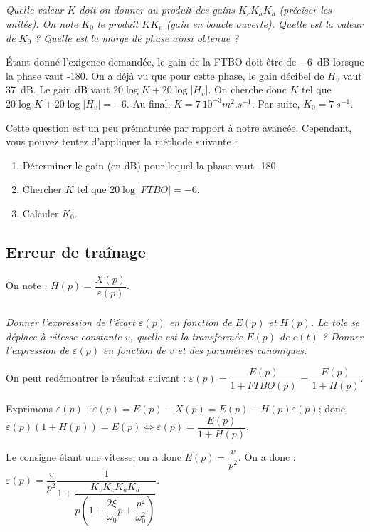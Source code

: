 \documentclass[10pt,fleqn]{article} %
\begin{document}
\begin{multicols}{2}
\subparagraph{}\textit{Quelle valeur $K$ doit-on donner au produit des gains $K_c K_a K_d$ (préciser les unités).
On note $K_0$ le produit $KK_v$ (gain en boucle ouverte). Quelle est la valeur de $K_0$ ?
Quelle est la marge de phase ainsi obtenue ?}
\ifprof
\begin{corrige}
Étant donné l'exigence demandée, le gain de la FTBO doit être de \SI{-6}{dB} lorsque la phase vaut -180\degres.
On a déjà vu que pour cette phase, le gain décibel de $H_v$ vaut \SI{37}{dB}. Le gain dB vaut $20\log K + 20 \log |H_v|$. On cherche donc $K$ tel que $20\log K + 20 \log |H_v|=-6$. Au final, $K=\SI{7}{10^{-3}m^2.s^{-1}}$. Par suite, $K_0=\SI{7}{s^{-1}}$.
\end{corrige}
\else
\fi

\begin{methode}
Cette question est un peu prématurée par rapport à notre avancée. Cependant, vous pouvez tentez d'appliquer la méthode suivante : 
\begin{enumerate}
\item Déterminer le gain (en dB) pour lequel la phase vaut -180\degres.
\item Chercher $K$ tel que $20\log|FTBO|=-6$.
\item Calculer $K_0$.
\end{enumerate}
\end{methode}

\subsection*{Erreur de traînage}
\ifprof
\else
On note :   $H(p)=\dfrac{X(p)}{\varepsilon(p)}$.
\fi

\subparagraph{}\textit{Donner l'expression de l'écart $\varepsilon(p)$ en fonction de $E(p)$ et $H(p)$. La tôle se déplace à vitesse constante $v$, quelle est la transformée $E(p)$ de $e(t)$ ? Donner l'expression de $\varepsilon(p)$ en fonction de $v$ et des paramètres canoniques.}

\ifprof \begin{corrige}
On peut redémontrer le résultat suivant : $\varepsilon(p)=\dfrac{E(p)}{1+FTBO(p)}=\dfrac{E(p)}{1+H(p)}$.

Exprimons $\varepsilon(p)$ : $\varepsilon(p)=E(p)-X(p)=E(p)-H(p)\varepsilon(p)$; donc 
$\varepsilon(p)\left(1+H(p)\right)=E(p)\Longleftrightarrow \varepsilon(p)=\dfrac{E(p)}{1+H(p)}$.

Le consigne étant une vitesse, on a donc $E(p)=\dfrac{v}{p^2}$. On a donc : 
$\varepsilon(p)=\dfrac{v}{p^2}\dfrac{1}{1+\dfrac{K_vK_cK_aK_d}{p\left( 1+\dfrac{2\xi}{\omega_0} p + \dfrac{p^2}{\omega_0^2} \right)}}$.
\end{corrige} \else \fi


\end{multicols}
\end{document}
